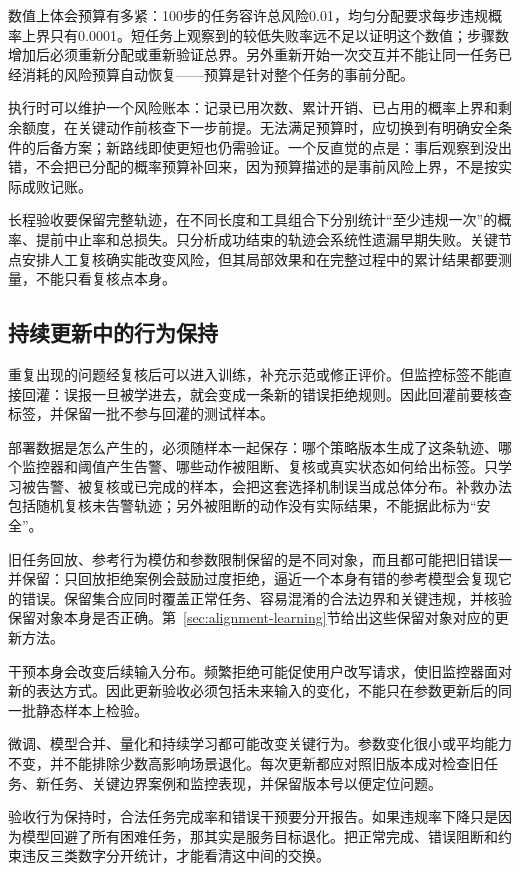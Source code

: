 数值上体会预算有多紧：100步的任务容许总风险0.01，均匀分配要求每步违规概率上界只有0.0001。短任务上观察到的较低失败率远不足以证明这个数值；步骤数增加后必须重新分配或重新验证总界。另外重新开始一次交互并不能让同一任务已经消耗的风险预算自动恢复——预算是针对整个任务的事前分配。

执行时可以维护一个风险账本：记录已用次数、累计开销、已占用的概率上界和剩余额度，在关键动作前核查下一步前提。无法满足预算时，应切换到有明确安全条件的后备方案；新路线即使更短也仍需验证。一个反直觉的点是：事后观察到没出错，不会把已分配的概率预算补回来，因为预算描述的是事前风险上界，不是按实际成败记账。

长程验收要保留完整轨迹，在不同长度和工具组合下分别统计“至少违规一次”的概率、提前中止率和总损失。只分析成功结束的轨迹会系统性遗漏早期失败。关键节点安排人工复核确实能改变风险，但其局部效果和在完整过程中的累计结果都要测量，不能只看复核点本身。

\subsection{持续更新中的行为保持}
\label{sec:alignment-generalization-update}

重复出现的问题经复核后可以进入训练，补充示范或修正评价。但监控标签不能直接回灌：误报一旦被学进去，就会变成一条新的错误拒绝规则。因此回灌前要核查标签，并保留一批不参与回灌的测试样本。

部署数据是怎么产生的，必须随样本一起保存：哪个策略版本生成了这条轨迹、哪个监控器和阈值产生告警、哪些动作被阻断、复核或真实状态如何给出标签。只学习被告警、被复核或已完成的样本，会把这套选择机制误当成总体分布。补救办法包括随机复核未告警轨迹；另外被阻断的动作没有实际结果，不能据此标为“安全”。

旧任务回放、参考行为模仿和参数限制保留的是不同对象，而且都可能把旧错误一并保留：只回放拒绝案例会鼓励过度拒绝，逼近一个本身有错的参考模型会复现它的错误。保留集合应同时覆盖正常任务、容易混淆的合法边界和关键违规，并核验保留对象本身是否正确。第~\ref{sec:alignment-learning}节给出这些保留对象对应的更新方法。

干预本身会改变后续输入分布。频繁拒绝可能促使用户改写请求，使旧监控器面对新的表达方式。因此更新验收必须包括未来输入的变化，不能只在参数更新后的同一批静态样本上检验。

微调、模型合并、量化和持续学习都可能改变关键行为。参数变化很小或平均能力不变，并不能排除少数高影响场景退化。每次更新都应对照旧版本成对检查旧任务、新任务、关键边界案例和监控表现，并保留版本号以便定位问题。

验收行为保持时，合法任务完成率和错误干预要分开报告。如果违规率下降只是因为模型回避了所有困难任务，那其实是服务目标退化。把正常完成、错误阻断和约束违反三类数字分开统计，才能看清这中间的交换。

